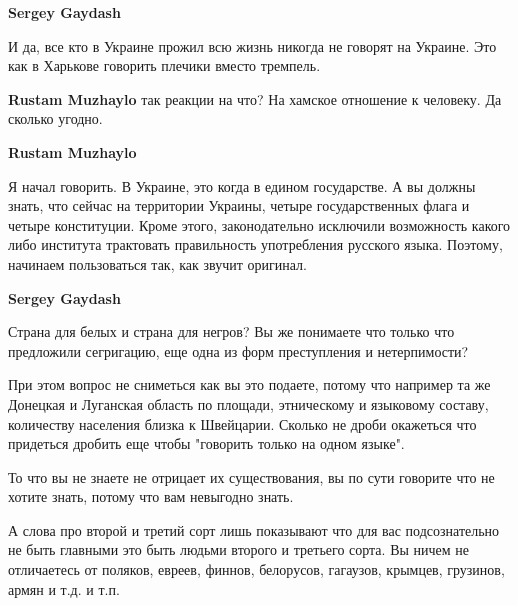 \begin{itemize}
\begin{itemize}
\textbf{Sergey Gaydash}

И да, все кто в Украине прожил всю жизнь никогда не говорят на Украине. Это как
в Харькове говорить плечики вместо тремпель.

 
\textbf{Rustam Muzhaylo} так реакции на что? На хамское отношение к человеку. Да сколько угодно.

 
\textbf{Rustam Muzhaylo} 

Я начал говорить. В Украине, это когда в едином государстве. А вы должны знать,
что сейчас на территории Украины, четыре государственных флага и четыре
конституции. Кроме этого, законодательно исключили возможность какого либо
института трактовать правильность употребления русского языка. Поэтому,
начинаем пользоваться так, как звучит оригинал.

 
\textbf{Sergey Gaydash}

Страна для белых и страна для негров? Вы же понимаете что только что предложили
сегригацию, еще одна из форм преступления и нетерпимости?

При этом вопрос не сниметься как вы это подаете, потому что например та же
Донецкая и Луганская область по площади, этническому и языковому составу,
количеству населения близка к Швейцарии. Сколько не дроби окажеться что
придеться дробить еще чтобы "говорить только на одном языке".

То что вы не знаете не отрицает их существования, вы по сути говорите что не
хотите знать, потому что вам невыгодно знать.

А слова про второй и третий сорт лишь показывают что для вас подсознательно не
быть главными это быть людьми второго и третьего сорта. Вы ничем не отличаетесь
от поляков, евреев, финнов, белорусов, гагаузов, крымцев, грузинов, армян и
т.д. и т.п.


\end{itemize}
\end{itemize}
